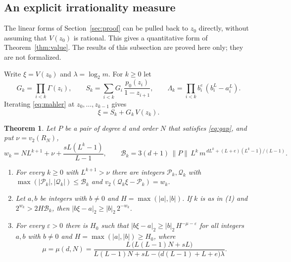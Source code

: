 \documentclass[11pt,reqno]{amsart}
\newtheorem{theorem}{Theorem}[section]
\theoremstyle{definition}
\theoremstyle{remark}
\newcommand{\vt}{v_2}
\begin{document}
\subsection{An explicit irrationality measure}\label{ssec:measure}
The linear forms of Section~\ref{sec:proof} can be pulled back to $z_0$
directly, without assuming that $V(z_0)$ is rational.  This gives a
quantitative form of Theorem~\ref{thm:value}.  The results of this
subsection are proved here only; they are not formalized.

Write $\xi=V(z_0)$ and $\lambda=\log_2m$.  For $k\ge 0$ let
\[
  G_k=\prod_{i<k}\Gamma(z_i),\qquad
  S_k=\sum_{i<k}G_i\,\frac{p_0(z_i)}{1-z_{i+1}},\qquad
  \Lambda_k=\prod_{i<k}b_i^{e}\,(b_i^{L}-a_i^{L}).
\]
Iterating \eqref{eq:mahler} at $z_0,\dots,z_{k-1}$ gives
\begin{equation}\label{eq:pullback}
  \xi=S_k+G_k\,V(z_k).
\end{equation}

\begin{theorem}\label{thm:measure}
Let $P$ be a pair of degree $d$ and order $N$ that satisfies
\eqref{eq:gap}, and put $\nu=\vt(R_N)$,
\[
  w_k=NL^{k+1}+\nu+\frac{sL(L^{k}-1)}{L-1},\qquad
  \mathcal B_k=3(d+1)\,\|P\|\,L^{k}\,m^{\,dL^{k}+(L+e)(L^{k}-1)/(L-1)} .
\]
\begin{enumerate}
\item For every $k\ge 0$ with $L^{k+1}>\nu$ there are integers
$\mathcal P_k,\mathcal Q_k$ with
$\max(|\mathcal P_k|,|\mathcal Q_k|)\le\mathcal B_k$ and
$\vt(\mathcal Q_k\xi-\mathcal P_k)=w_k$.
\item Let $a,b$ be integers with $b\ne 0$ and $H=\max(|a|,|b|)$.  If $k$ is
as in \textup{(1)} and $2^{w_k}>2H\mathcal B_k$, then
$|b\xi-a|_2\ge|b|_2\,2^{-w_k}$.
\item For every $\varepsilon>0$ there is $H_0$ such that
$|b\xi-a|_2\ge|b|_2\,H^{-\mu-\varepsilon}$ for all integers $a,b$ with
$b\ne 0$ and $H=\max(|a|,|b|)\ge H_0$, where
\[
  \mu=\mu(d,N)=\frac{L\,\bigl(L(L-1)N+sL\bigr)}
  {L(L-1)N+sL-\bigl(d(L-1)+L+e\bigr)\lambda} .
\]
\end{enumerate}
\end{theorem}
\end{document}
